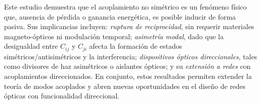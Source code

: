 Este estudio demuestra que el acoplamiento no simétrico es un fenómeno físico que, ausencia de pérdida o ganancia energética, es posible inducir de forma pasiva. Sus implicancias incluyen: \textit{ruptura de reciprocidad}, sin requerir materiales magneto-ópticos ni modulación temporal; \textit{asimetría modal}, dado que la desigualdad entre \( C_{ij} \) y \( C_{ji} \) afecta la formación de estados simétricos/antisimétricos y la interferencia; \textit{dispositivos ópticos direccionales}, tales como divisores de haz asimétricos o aislantes ópticos; y su \textit{extensión a redes} con acoplamientos direccionados. En conjunto, estos resultados permiten extender la teoría de modos acoplados y abren nuevas oportunidades en el diseño de redes ópticas con funcionalidad direccional.

